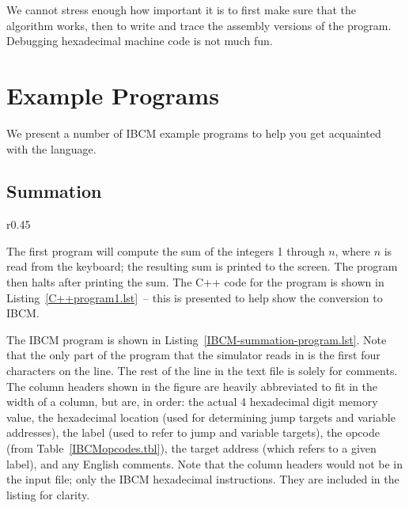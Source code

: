 We cannot stress enough how important it is to first make sure that
the algorithm works, then to write and trace the assembly versions of
the program.  Debugging hexadecimal machine code is not much fun.



\section{Example Programs}


We present a number of IBCM example programs to help you get
acquainted with the language.

\subsection{Summation}

\begin{wrapfigure}{r}{0.45\textwidth}

\vspace{-0.25in}
\end{wrapfigure}

The first program will compute the sum of the integers 1 through $n$,
where $n$ is read from the keyboard; the resulting sum is printed to
the screen. The program then halts after printing the sum.  The C++
code for the program is shown in Listing~\ref{C++program1.lst}~-- this is
presented to help show the conversion to IBCM.

The IBCM program is shown in Listing~\ref{IBCM-summation-program.lst}.
Note that the only part of the program that the simulator reads in is
the first four characters on the line.  The rest of the line in the
text file is solely for comments.  The column headers shown in the
figure are heavily abbreviated to fit in the width of a column, but
are, in order: the actual 4 hexadecimal digit memory value, the
hexadecimal location (used for determining jump targets and variable
addresses), the label (used to refer to jump and variable targets),
the opcode (from Table~\ref{IBCMopcodes.tbl}), the target address (which
refers to a given label), and any English comments. Note that the
column headers would not be in the input file; only the IBCM
hexadecimal instructions.  They are included in the listing for
clarity.

\begin{figure}[h]

\end{figure}

